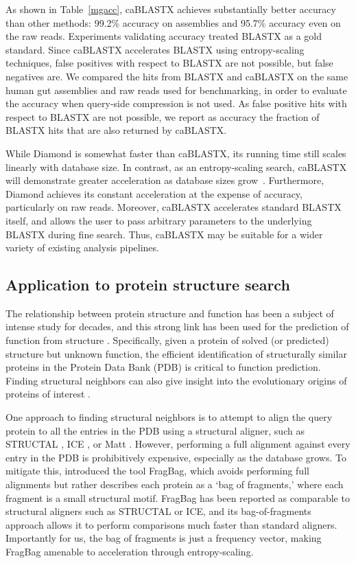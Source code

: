 \documentclass[review,preprint,12pt]{elsarticle}
\renewcommand{\cite}{\citep} %
\theoremstyle{definition}
\theoremstyle{remark}
\numberwithin{equation}{section}
\begin{document}
As shown in Table~\ref{mgacc}, caBLASTX achieves substantially better accuracy
than other methods: 99.2\% accuracy on assemblies and 95.7\% 
accuracy even on the raw reads.
Experiments validating accuracy treated BLASTX as a gold standard. 
Since caBLASTX accelerates BLASTX
using entropy-scaling techniques, false positives with respect to BLASTX are 
not possible, but false negatives are.
We compared the hits from BLASTX and caBLASTX on the same human gut
assemblies and raw reads used for benchmarking, in order to evaluate the accuracy when
query-side compression is not used.
As false positive hits with respect to BLASTX are not possible, we report as 
accuracy the fraction of BLASTX hits that are also returned by caBLASTX.

While Diamond is somewhat faster than caBLASTX, its running time still scales
linearly with database size.
In contrast, as an entropy-scaling search, caBLASTX will demonstrate greater
acceleration as database sizes grow~\cite{daniels2013compressive}.
Furthermore, Diamond achieves its constant acceleration at the expense of 
accuracy, particularly on raw reads.
Moreover, caBLASTX accelerates standard BLASTX itself, and allows the
user to pass arbitrary parameters to the underlying BLASTX during fine search.
Thus, caBLASTX may be suitable for a wider variety of existing analysis 
pipelines.

\subsection{Application to protein structure search}

The relationship between protein structure and function has been a subject of intense study for decades,
and this strong link has been used for the prediction of function from structure \cite{hegyi1999relationship}.
Specifically, given a protein of solved (or predicted) structure but unknown function, the efficient identification
of structurally similar proteins in the Protein Data Bank (PDB) is critical to function prediction.
Finding structural neighbors can also give insight into the evolutionary origins of proteins of interest \cite{yona1999protomap,nepomnyachiy2014global}.

One approach to finding structural neighbors is to attempt to align the query protein to all the entries in the PDB using a structural aligner, such as 
STRUCTAL \cite{subbiah1993structural}, ICE \cite{shindyalov1998protein}, or 
Matt \cite{menke2008matt}.
However, performing a full alignment against every entry in the PDB is prohibitively expensive, especially as the database grows.
To mitigate this, \citep{budowski2010fragbag} introduced the tool FragBag, which avoids performing full alignments but rather describes each protein as a
`bag of fragments,' where each fragment is a small structural motif.
FragBag has been reported as comparable to structural aligners such as STRUCTAL or ICE,
and its bag-of-fragments approach
allows it to perform comparisons much faster than standard aligners.
Importantly for us, the bag of fragments is just a frequency vector, making
FragBag amenable to acceleration through entropy-scaling.
\end{document}
